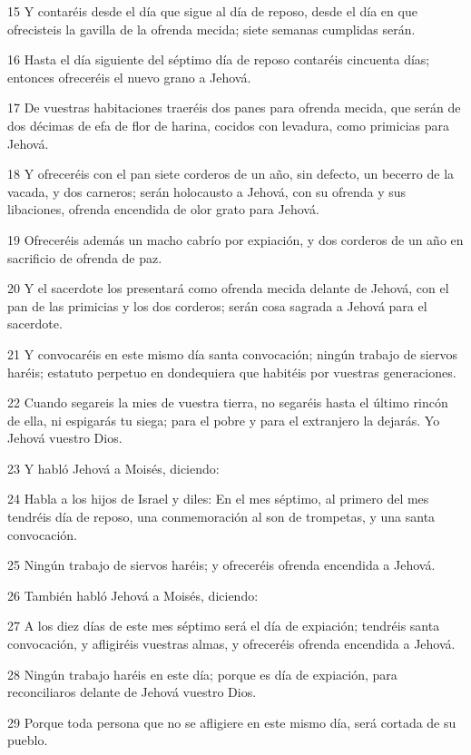 \par 15 Y contaréis desde el día que sigue al día de reposo, desde el día en que ofrecisteis la gavilla de la ofrenda mecida; siete semanas cumplidas serán.
\par 16 Hasta el día siguiente del séptimo día de reposo contaréis cincuenta días; entonces ofreceréis el nuevo grano a Jehová.
\par 17 De vuestras habitaciones traeréis dos panes para ofrenda mecida, que serán de dos décimas de efa   de flor de harina, cocidos con levadura, como primicias para Jehová.
\par 18 Y ofreceréis con el pan siete corderos de un año, sin defecto, un becerro de la vacada, y dos carneros; serán holocausto a Jehová, con su ofrenda y sus libaciones, ofrenda encendida de olor grato para Jehová.
\par 19 Ofreceréis además un macho cabrío por expiación, y dos corderos de un año en sacrificio de ofrenda de paz.
\par 20 Y el sacerdote los presentará como ofrenda mecida delante de Jehová, con el pan de las primicias y los dos corderos; serán cosa sagrada a Jehová para el sacerdote.
\par 21 Y convocaréis en este mismo día santa convocación; ningún trabajo de siervos haréis; estatuto perpetuo en dondequiera que habitéis por vuestras generaciones.
\par 22 Cuando segareis la mies de vuestra tierra, no segaréis hasta el último rincón de ella, ni espigarás tu siega; para el pobre y para el extranjero la dejarás. Yo Jehová vuestro Dios.
\par 23 Y habló Jehová a Moisés, diciendo:
\par 24 Habla a los hijos de Israel y diles: En el mes séptimo, al primero del mes tendréis día de reposo, una conmemoración al son de trompetas, y una santa convocación.
\par 25 Ningún trabajo de siervos haréis; y ofreceréis ofrenda encendida a Jehová.
\par 26 También habló Jehová a Moisés, diciendo:
\par 27 A los diez días de este mes séptimo será el día de expiación; tendréis santa convocación, y afligiréis vuestras almas, y ofreceréis ofrenda encendida a Jehová.
\par 28 Ningún trabajo haréis en este día; porque es día de expiación, para reconciliaros delante de Jehová vuestro Dios.
\par 29 Porque toda persona que no se afligiere en este mismo día, será cortada de su pueblo.
